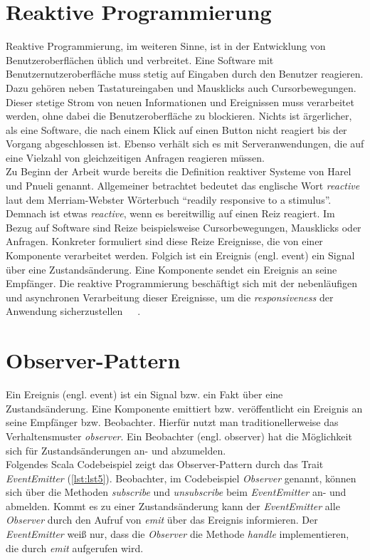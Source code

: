 \section{Reaktive Programmierung}
Reaktive Programmierung, im weiteren Sinne, ist in der Entwicklung von Benutzeroberflächen üblich und verbreitet. Eine Software mit Benutzernutzeroberfläche muss stetig auf Eingaben durch den Benutzer reagieren. Dazu gehören neben Tastatureingaben und Mausklicks auch Cursorbewegungen. Dieser stetige Strom von neuen Informationen und Ereignissen muss verarbeitet werden, ohne dabei die Benutzeroberfläche zu blockieren. Nichts ist ärgerlicher, als eine Software, die nach einem Klick auf einen Button nicht reagiert bis der Vorgang abgeschlossen ist. Ebenso verhält sich es mit Serveranwendungen, die auf eine Vielzahl von gleichzeitigen Anfragen reagieren müssen.\\
Zu Beginn der Arbeit wurde bereits die Definition reaktiver Systeme von Harel und Pnueli genannt. Allgemeiner betrachtet bedeutet das englische Wort \textit{reactive} laut dem Merriam-Webster Wörterbuch \enquote{readily responsive to a stimulus}. Demnach ist etwas \textit{reactive}, wenn es bereitwillig auf einen Reiz reagiert. Im Bezug auf Software sind Reize beispielsweise Cursorbewegungen, Mausklicks oder Anfragen. Konkreter formuliert sind diese Reize Ereignisse, die von einer Komponente verarbeitet werden. Folgich ist ein Ereignis (engl. event) ein Signal über eine Zustandsänderung. Eine Komponente sendet ein Ereignis an seine Empfänger. Die reaktive Programmierung beschäftigt sich mit der nebenläufigen und asynchronen Verarbeitung dieser Ereignisse, um die \textit{responsiveness} der Anwendung sicherzustellen~\cite{rappl_introduction_2016}~\cite[S.~4]{carkci_dataflow_2014}~\cite[S.~5]{blackheath_functional_2015}.

\section{Observer-Pattern}
Ein Ereignis (engl. event) ist ein Signal bzw. ein Fakt über eine Zustandsänderung. Eine Komponente emittiert bzw. veröffentlicht ein Ereignis an seine Empfänger bzw. Beobachter. Hierfür nutzt man traditionellerweise das Verhaltensmuster \textit{observer}. Ein Beobachter (engl. observer) hat die Möglichkeit sich für Zustandsänderungen an- und abzumelden.\\
Folgendes Scala Codebeispiel zeigt das Observer-Pattern durch das Trait \textit{EventEmitter} (\ref{lst:lst5}). Beobachter, im Codebeispiel \textit{Observer} genannt, können sich über die Methoden \textit{subscribe} und \textit{unsubscribe} beim \textit{EventEmitter} an- und abmelden. Kommt es zu einer Zustandsänderung kann der \textit{EventEmitter} alle \textit{Observer} durch den Aufruf von \textit{emit} über das Ereignis informieren. Der \textit{EventEmitter} weiß nur, dass die \textit{Observer} die Methode \textit{handle} implementieren, die durch \textit{emit} aufgerufen wird.

